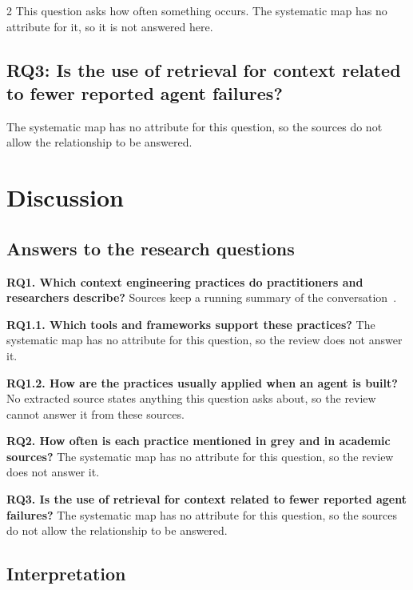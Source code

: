 \documentclass[10pt,a4paper]{article}
\begin{document}
\begin{multicols*}{2}
This question asks how often something occurs.
The systematic map has no attribute for it, so it is not answered here.

\subsection{RQ3: Is the use of retrieval for context related to fewer reported agent failures?}\label{sec:rq3-is-the-use-of-retrieval-for-context}

The systematic map has no attribute for this question, so the sources do not allow the relationship to be answered.

\section{Discussion}\label{sec:discussion}

\subsection{Answers to the research questions}\label{sec:answers-to-the-research-questions}

\noindent\textbf{RQ1. Which context engineering practices do practitioners and researchers describe?} Sources keep a running summary of the conversation~\cite{ana2025managing}.\par\smallskip
\noindent\textbf{RQ1.1. Which tools and frameworks support these practices?} The systematic map has no attribute for this question, so the review does not answer it.\par\smallskip
\noindent\textbf{RQ1.2. How are the practices usually applied when an agent is built?} No extracted source states anything this question asks about, so the review cannot answer it from these sources.\par\smallskip
\noindent\textbf{RQ2. How often is each practice mentioned in grey and in academic sources?} The systematic map has no attribute for this question, so the review does not answer it.\par\smallskip
\noindent\textbf{RQ3. Is the use of retrieval for context related to fewer reported agent failures?} The systematic map has no attribute for this question, so the sources do not allow the relationship to be answered.\par\smallskip

\subsection{Interpretation}\label{sec:interpretation}


\end{multicols*}
\end{document}
